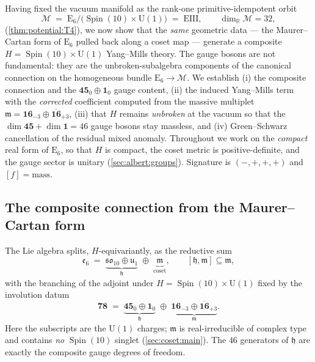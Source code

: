 \documentclass[11pt]{article}
\theoremstyle{plain}
\theoremstyle{definition}
\theoremstyle{remark}
\newcommand{\U}[1]{\mathrm{U}(#1)}
\newcommand{\E}[1]{\mathrm{E}_{#1}}
\newcommand{\Spin}{\operatorname{Spin}}
\newcommand{\Uone}{\U{1}}
\newcommand{\ESix}{\E{6}}
\begin{document}
Having fixed the vacuum manifold as the rank-one primitive-idempotent
orbit
\[
  \mathcal M \;=\; \ESix/\bigl(\Spin(10)\times\Uone\bigr) \;=\; \mathrm{EIII},
  \qquad \dim_{\mathbb R}\mathcal M = 32,
\]
(\autoref{thm:potential:T4}), we now show that the \emph{same} geometric
data --- the Maurer--Cartan form of $\ESix$ pulled back along a coset map
--- generate a composite $H=\Spin(10)\times\Uone$ Yang--Mills theory.
The gauge bosons are not fundamental: they are the unbroken-subalgebra
components of the canonical connection on the homogeneous bundle
$\ESix\to\mathcal M$. We establish (i) the composite connection and the
$\mathbf{45}_{0}\oplus\mathbf{1}_{0}$ gauge content, (ii) the induced
Yang--Mills term with the \emph{corrected} coefficient computed from the
massive multiplet $\mathfrak m=\mathbf{16}_{-3}\oplus\overline{\mathbf{16}}_{+3}$,
(iii) that $H$ remains \emph{unbroken} at the vacuum so that the
$\dim\mathbf{45}+\dim\mathbf 1 = 46$ gauge bosons stay massless, and
(iv) Green--Schwarz cancellation of the residual mixed anomaly. Throughout
we work on the \emph{compact} real form of $\ESix$, so that $H$ is compact,
the coset metric is positive-definite, and the gauge sector is unitary
(\autoref{sec:albert:groups}). Signature is $(-,+,+,+)$ and
$[f]=\text{mass}$.

\subsection{The composite connection from the Maurer--Cartan form}
\label{sec:gauge:MC}

The Lie algebra splits, $H$-equivariantly, as the reductive sum
\begin{equation}\label{eq:gauge:split}
  \mathfrak e_6
  \;=\;
  \underbrace{\mathfrak{so}_{10}\oplus\mathfrak u_{1}}_{\mathfrak h}
  \;\oplus\;
  \underbrace{\mathfrak m}_{\text{coset}},
  \qquad
  [\mathfrak h,\mathfrak m]\subseteq\mathfrak m,
\end{equation}
with the branching of the adjoint under $H=\Spin(10)\times\Uone$ fixed by
the involution datum
\begin{equation}\label{eq:gauge:adjoint}
  \mathbf{78}
  \;=\;
  \underbrace{\mathbf{45}_{0}\oplus\mathbf 1_{0}}_{\mathfrak h}
  \;\oplus\;
  \underbrace{\mathbf{16}_{-3}\oplus\overline{\mathbf{16}}_{+3}}_{\mathfrak m}.
\end{equation}
Here the subscripts are the $\Uone$ charges; $\mathfrak m$ is real-irreducible
of complex type and contains \emph{no} $\Spin(10)$ singlet
(\autoref{sec:coset:main}). The $46$ generators of $\mathfrak h$ are
exactly the composite gauge degrees of freedom.
\end{document}

